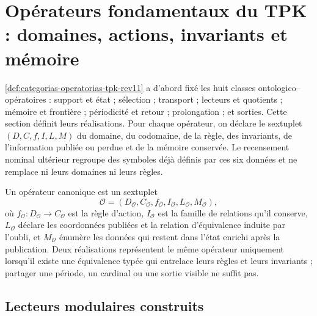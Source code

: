 \section{Opérateurs fondamentaux du TPK : domaines, actions, invariants et
mémoire}
\label{sec:inventario-operatorio-tpk-rev11}

\cref{def:categorias-operatorias-tpk-rev11} a d'abord fixé les huit
classes ontologico--opératoires : support et état ; sélection ; transport ;
lecteurs et quotients ; mémoire et frontière ; périodicité et retour ;
prolongation ; et sorties. Cette section définit leurs réalisations. Pour chaque
opérateur, on déclare le sextuplet \((D,C,f,I,L,M)\) du domaine, du codomaine, de la règle,
des invariants, de l'information publiée ou perdue et de la mémoire conservée. Le recensement
nominal ultérieur regroupe des symboles déjà définis par ces six données et ne
remplace ni leurs domaines ni leurs règles.

\begin{definition}
Un opérateur canonique est un sextuplet
\[
 \mathcal O=(D_{\mathcal O},C_{\mathcal O},f_{\mathcal O},
 I_{\mathcal O},L_{\mathcal O},M_{\mathcal O}),
\]
où \(f_{\mathcal O}:D_{\mathcal O}\to C_{\mathcal O}\) est la règle
d'action, \(I_{\mathcal O}\) est la famille de relations qu'il conserve,
\(L_{\mathcal O}\) déclare les coordonnées publiées et la relation
d'équivalence induite par l'oubli, et \(M_{\mathcal O}\) énumère les données
qui restent dans l'état enrichi après la publication. Deux
réalisations représentent le même opérateur uniquement lorsqu'il existe une
équivalence typée qui entrelace leurs règles et leurs invariants ; partager une
période, un cardinal ou une sortie visible ne suffit pas.
\end{definition}

\subsection{Lecteurs modulaires construits}

